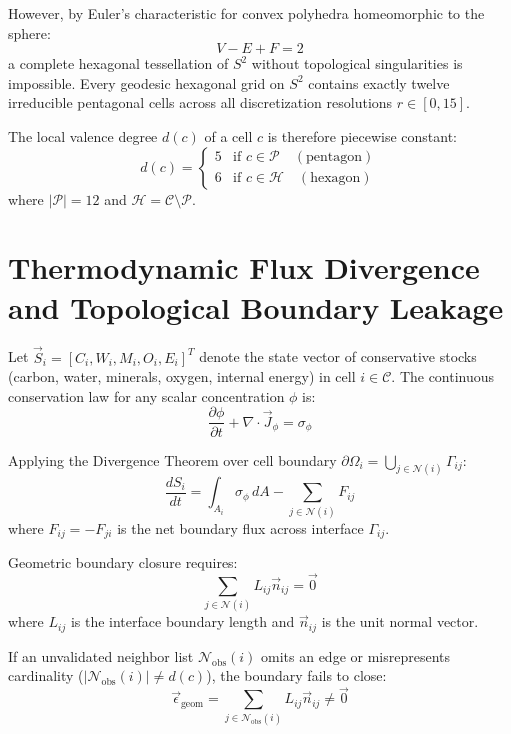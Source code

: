 \documentclass[10pt,journal,compsoc]{IEEEtran}
\begin{document}
However, by Euler's characteristic for convex polyhedra homeomorphic to the sphere:
\begin{equation}
V - E + F = 2
\end{equation}
a complete hexagonal tessellation of $S^2$ without topological singularities is impossible. Every geodesic hexagonal grid on $S^2$ contains exactly twelve irreducible pentagonal cells across all discretization resolutions $r \in [0, 15]$.

The local valence degree $d(c)$ of a cell $c$ is therefore piecewise constant:
\begin{equation}
d(c) = \begin{cases}
5 & \text{if } c \in \mathcal{P} \quad (\text{pentagon}) \\
6 & \text{if } c \in \mathcal{H} \quad (\text{hexagon})
\end{cases}
\end{equation}
where $|\mathcal{P}| = 12$ and $\mathcal{H} = \mathcal{C} \setminus \mathcal{P}$.

\section{Thermodynamic Flux Divergence and Topological Boundary Leakage}
Let $\vec{S}_i = [C_i, W_i, M_i, O_i, E_i]^T$ denote the state vector of conservative stocks (carbon, water, minerals, oxygen, internal energy) in cell $i \in \mathcal{C}$. The continuous conservation law for any scalar concentration $\phi$ is:
\begin{equation}
\frac{\partial \phi}{\partial t} + \nabla \cdot \vec{J}_{\phi} = \sigma_{\phi}
\end{equation}

Applying the Divergence Theorem over cell boundary $\partial \Omega_i = \bigcup_{j \in \mathcal{N}(i)} \Gamma_{ij}$:
\begin{equation}
\frac{d S_i}{dt} = \int_{A_i} \sigma_{\phi} \, dA - \sum_{j \in \mathcal{N}(i)} F_{ij}
\end{equation}
where $F_{ij} = -F_{ji}$ is the net boundary flux across interface $\Gamma_{ij}$.

Geometric boundary closure requires:
\begin{equation}
\sum_{j \in \mathcal{N}(i)} L_{ij} \vec{n}_{ij} = \vec{0}
\end{equation}
where $L_{ij}$ is the interface boundary length and $\vec{n}_{ij}$ is the unit normal vector.

If an unvalidated neighbor list $\mathcal{N}_{\text{obs}}(i)$ omits an edge or misrepresents cardinality ($|\mathcal{N}_{\text{obs}}(i)| \neq d(c)$), the boundary fails to close:
\begin{equation}
\vec{\epsilon}_{\text{geom}} = \sum_{j \in \mathcal{N}_{\text{obs}}(i)} L_{ij} \vec{n}_{ij} \neq \vec{0}
\end{equation}
\end{document}
